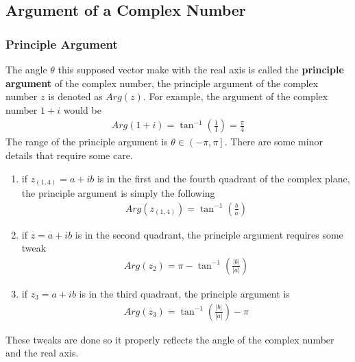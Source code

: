 \documentclass[12pt]{book}
\newcommand{\paren}[1]{\left( #1 \right)}
\newcommand{\openclose}[1]{\left( #1 \right]}
\begin{document}
\subsection{Argument of a Complex Number}
\subsubsection{Principle Argument}
The angle $\theta$ this supposed vector make with the real axis is called the \textbf{principle argument} of the complex number, the principle argument of the complex number $z$ is denoted as $Arg(z)$. For example, the argument of the complex number $1+i$ would be 
\begin{align}
    Arg(1+i) = \tan^{-1}\paren{\frac{1}{1}} = \frac{\pi}{4}
\end{align}
The range of the principle argument is $\theta \in \openclose{-\pi,\pi}$. There are some minor details that require some care.
\begin{enumerate}
    \item if $z_{(1,4)}=a+ib$ is in the first and the fourth quadrant of the complex plane, the principle argument is simply the following
    \begin{align}
        Arg(z_{(1,4)}) = \tan^{-1}\paren{\frac{b}{a}}
    \end{align}
    \item if $z = a+ib$ is in the second quadrant, the principle argument requires some tweak
    \begin{align}
        Arg\paren{z_2} = \pi - \tan^{-1}\paren{\frac{|b|}{|a|}}
    \end{align}
    \item if $z_3=a+ib$ is in the third quadrant, the principle argument is
    \begin{align}
        Arg(z_3) = \tan^{-1}\paren{\frac{|b|}{|a|}} - \pi
    \end{align}
\end{enumerate}
These tweaks are done so it properly reflects the angle of the complex number and the real axis. 
\newpage
\end{document}
